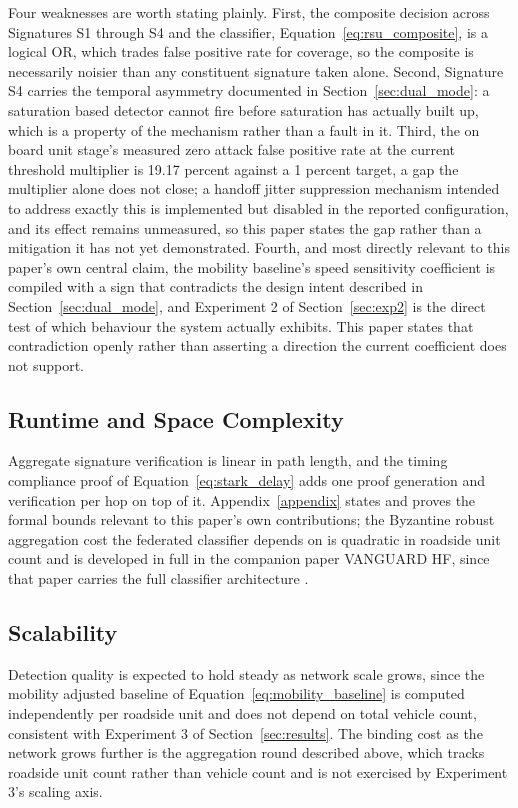 \documentclass[final,5p,twocolumn]{elsarticle}
\theoremstyle{remark}
\theoremstyle{plain}
\begin{document}
Four weaknesses are worth stating plainly. First, the composite decision
across Signatures S1 through S4 and the classifier, Equation~\eqref{eq:rsu_composite},
is a logical OR, which trades false positive rate for coverage, so the
composite is necessarily noisier than any constituent signature taken
alone. Second, Signature S4
carries the temporal asymmetry documented in Section~\ref{sec:dual_mode}: a
saturation based detector cannot fire before saturation has actually built
up, which is a property of the mechanism rather than a fault in it. Third,
the on board unit stage's measured zero attack false positive rate at the
current threshold multiplier is 19.17 percent against a 1 percent target,
a gap the multiplier alone does not close; a handoff jitter suppression
mechanism intended to address exactly this is implemented but disabled in
the reported configuration, and its effect remains unmeasured, so this
paper states the gap rather than a mitigation it has not yet demonstrated.
Fourth, and most directly relevant to this paper's own central claim, the
mobility baseline's speed sensitivity coefficient is compiled with a sign
that contradicts the design intent described in
Section~\ref{sec:dual_mode}, and Experiment 2 of
Section~\ref{sec:exp2} is the direct test of which behaviour the system
actually exhibits. This paper states that contradiction openly rather than
asserting a direction the current coefficient does not support.

\subsection{Runtime and Space Complexity}
Aggregate signature verification is linear in path length, and the timing
compliance proof of Equation~\eqref{eq:stark_delay} adds one proof
generation and verification per hop on top of it. Appendix~\ref{appendix}
states and proves the formal bounds relevant to this paper's own
contributions; the Byzantine robust aggregation cost the federated
classifier depends on is quadratic in roadside unit count and is developed
in full in the companion paper VANGUARD HF, since that paper carries the
full classifier architecture \cite{VanguardHF2026}.

\subsection{Scalability}
Detection quality is expected to hold steady as network scale grows, since
the mobility adjusted baseline of Equation~\eqref{eq:mobility_baseline} is
computed independently per roadside unit and does not depend on total
vehicle count, consistent with Experiment 3 of Section~\ref{sec:results}.
The binding cost as the network grows further is the aggregation round
described above, which tracks roadside unit count rather than vehicle
count and is not exercised by Experiment 3's scaling axis.
\end{document}
